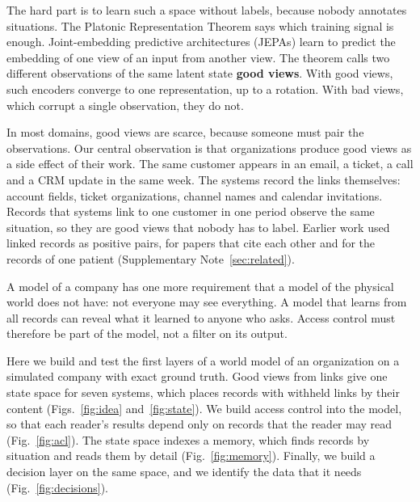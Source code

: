 \documentclass[11pt]{article}
\newcommand{\good}{\textcolor{goodblue}{\textbf{good views}}}
\begin{document}
The hard part is to learn such a space without labels, because nobody annotates situations. The Platonic Representation Theorem\citep{huh2024platonic,balestriero2026platonic} says which training signal is enough. Joint-embedding predictive architectures (JEPAs) learn to predict the embedding of one view of an input from another view\citep{lecun2022path,assran2023ijepa,balestriero2025lejepa}. The theorem calls two different observations of the same latent state \good{}. With good views, such encoders converge to one representation, up to a rotation. With bad views, which corrupt a single observation, they do not.

In most domains, good views are scarce, because someone must pair the observations. Our central observation is that organizations produce good views as a side effect of their work. The same customer appears in an email, a ticket, a call and a CRM update in the same week. The systems record the links themselves: account fields, ticket organizations, channel names and calendar invitations. Records that systems link to one customer in one period observe the same situation, so they are good views that nobody has to label. Earlier work used linked records as positive pairs, for papers that cite each other\citep{cohan2020specter} and for the records of one patient\citep{cai2024ehr} (Supplementary Note~\ref{sec:related}).

A model of a company has one more requirement that a model of the physical world does not have: not everyone may see everything. A model that learns from all records can reveal what it learned to anyone who asks. Access control must therefore be part of the model, not a filter on its output.

Here we build and test the first layers of a world model of an organization on a simulated company with exact ground truth\citep{eon2026era,gruenbaum2026era}. Good views from links give one state space for seven systems, which places records with withheld links by their content (Figs.~\ref{fig:idea} and~\ref{fig:state}). We build access control into the model, so that each reader's results depend only on records that the reader may read (Fig.~\ref{fig:acl}). The state space indexes a memory, which finds records by situation and reads them by detail (Fig.~\ref{fig:memory}). Finally, we build a decision layer on the same space, and we identify the data that it needs (Fig.~\ref{fig:decisions}).
\end{document}
